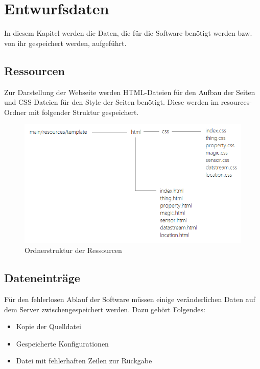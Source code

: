 \section{Entwurfsdaten}

In diesem Kapitel werden die Daten, die für die Software benötigt werden bzw. von ihr gespeichert werden, aufgeführt.

\subsection{Ressourcen}
Zur Darstellung der Webseite werden HTML-Dateien für den Aufbau der Seiten und CSS-Dateien für den Style der Seiten benötigt.
Diese werden im resources-Ordner mit folgender Struktur gespeichert.

\begin{figure}[htbp]
\centering
\includegraphics[scale=0.8]{images/resources.png}
\caption{Ordnerstruktur der Ressourcen}
\end{figure}

\subsection{Dateneinträge}
Für den fehlerlosen Ablauf der Software müssen einige veränderlichen Daten auf dem Server zwischengespeichert werden.
Dazu gehört Folgendes:
\begin{itemize}
\item Kopie der Quelldatei
\item Gespeicherte Konfigurationen
\item Datei mit fehlerhaften Zeilen zur Rückgabe
\end{itemize}